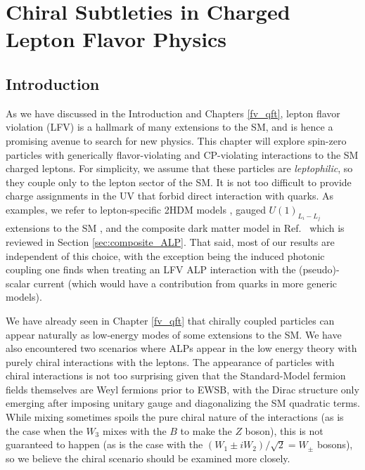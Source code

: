 \chapter{Chiral Subtleties in Charged Lepton Flavor Physics}
\label{lfv}

\section{Introduction}
As we have discussed in the Introduction and Chapters \ref{fv_qft}, lepton flavor violation (LFV) is a hallmark of many extensions to the SM, and is hence a promising avenue to search for new physics. This chapter will explore spin-zero particles with generically flavor-violating and CP-violating interactions to the SM charged leptons. For simplicity, we assume that these particles are {\it leptophilic}, so they couple only to the lepton sector of the SM. It is not too difficult to provide charge assignments in the UV that forbid direct interaction with quarks. As examples, we refer to lepton-specific 2HDM models \cite{Cao:2009as}, gauged $U(1)_{L_i-L_j}$ extensions to the SM \cite{Foot:1990mn,He:1990pn,He:1991qd,Heeck:2011wj}, and the composite dark matter model in Ref.~\cite{Davoudiasl:2017zws} which is reviewed in  Section \ref{sec:composite_ALP}. That said, most of our results are independent of this choice, with the exception being the induced photonic coupling one finds when treating an LFV ALP interaction with the (pseudo)-scalar current (which would have a contribution from quarks in more generic models).

We have already seen in Chapter \ref{fv_qft} that chirally coupled particles can appear naturally as low-energy modes of some extensions to the SM. We have also encountered two scenarios where ALPs appear in the low energy theory with purely chiral interactions with the leptons. The appearance of particles with chiral interactions is not too surprising given that the Standard-Model fermion fields themselves are Weyl fermions prior to EWSB, with the Dirac structure only emerging after imposing unitary gauge and diagonalizing the SM quadratic terms. While mixing sometimes spoils the pure chiral nature of the interactions (as is the case when the $W_3$ mixes with the $B$ to make the $Z$ boson), this is not guaranteed to happen (as is the case with the $(W_1\pm iW_2 )/\sqrt{2}= W_{\pm}$ bosons), so we believe the chiral scenario should be examined more closely.

